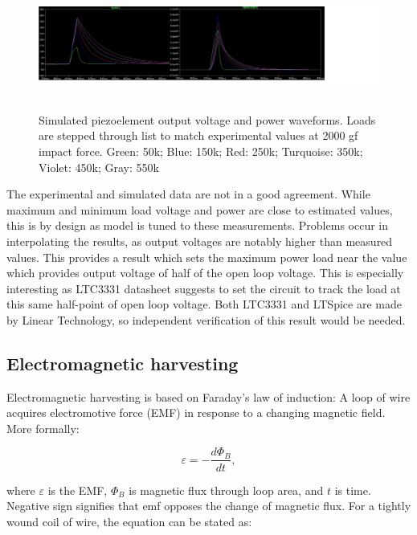  \begin{figure}[htb]
  \begin{center}
  \includegraphics[height=4cm]{images/own_dwg/ltspice_piezo_simulation}
  \end{center}
  \caption{Simulated piezoelement output voltage and power waveforms. Loads are stepped through list to match experimental values at 2000 gf impact force. Green: 50k; Blue: 150k; Red: 250k; Turquoise: 350k; Violet: 450k; Gray: 550k}
  \label{fiq:piezo_simulation_experimental}
\end{figure}

The experimental and simulated data are not in a good agreement. While maximum and minimum load voltage and power are close to estimated values, this is by design as model is tuned to these measurements. Problems occur in interpolating the results, as output voltages are notably higher than measured values. This provides a result which sets the maximum power load near the value which provides output voltage of half of the open loop voltage. This is especially interesting as LTC3331 datasheet \cite{LTC3331} suggests to set the circuit to track the load at this same half-point of open loop voltage. Both LTC3331 and LTSpice are made by Linear Technology, so independent verification of this result would be needed. 

\subsection{Electromagnetic harvesting}
Electromagnetic harvesting is based on Faraday's law of induction: A loop of wire acquires electromotive force (EMF) in response to a changing magnetic field. More formally:

\begin{equation}
  \varepsilon = - \frac{d \Phi_ {B}}{d t} , 
\end{equation}

where $\varepsilon$ is the EMF, $\Phi_{B}$ is magnetic flux through loop area, and $t$ is time. Negative sign signifies that emf opposes the change of magnetic flux. For a tightly wound coil of wire, the equation can be stated as: 

